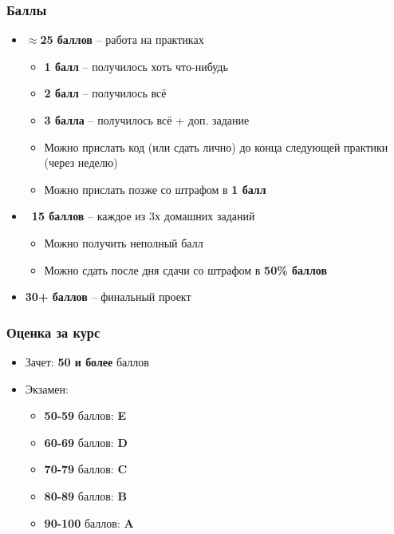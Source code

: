 \documentclass[10pt]{beamer}
\begin{document}
\begin{frame}
\frametitle{Баллы}
\begin{itemize}
\pause
\item \textbf{\begin{math}\approx\end{math}25 баллов} -- работа на практиках
\pause
\begin{itemize}
\item \textbf{1 балл} -- получилось хоть что-нибудь
\item \textbf{2 балл} -- получилось всё
\item \textbf{3 балла} -- получилось всё + доп. задание
\pause
\item Можно прислать код (или сдать лично) до конца следующей практики (через неделю)
\pause
\item Можно прислать позже со штрафом в \alert{\textbf{1 балл}}
\end{itemize}
\pause
\item \textbf{~15 баллов} -- каждое из 3х домашних заданий
\pause
\begin{itemize}
\item Можно получить неполный балл
\pause
\item Можно сдать после дня сдачи со штрафом в \alert{\textbf{50\% баллов}}
\end{itemize}
\pause
\item \textbf{30+ баллов} -- финальный проект
\end{itemize}
\end{frame}

\begin{frame}
\frametitle{Оценка за курс}
\pause
\begin{itemize}
\item Зачет: \textbf{50 и более} баллов
\pause
\item Экзамен:
\begin{itemize}
\item \textbf{50-59} баллов: \textbf{E}
\item \textbf{60-69} баллов: \textbf{D}
\item \textbf{70-79} баллов: \textbf{C}
\item \textbf{80-89} баллов: \textbf{B}
\item \textbf{90-100} баллов: \textbf{A}
\end{itemize}
\end{itemize}
\end{frame}
\end{document}
